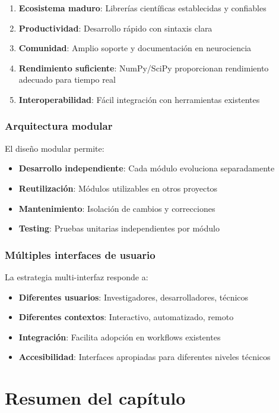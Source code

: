 \begin{itemize}
\begin{enumerate}
    \item \textbf{Ecosistema maduro}: Librerías científicas establecidas y confiables
    \item \textbf{Productividad}: Desarrollo rápido con sintaxis clara
    \item \textbf{Comunidad}: Amplio soporte y documentación en neurociencia
    \item \textbf{Rendimiento suficiente}: NumPy/SciPy proporcionan rendimiento adecuado para tiempo real
    \item \textbf{Interoperabilidad}: Fácil integración con herramientas existentes
\end{enumerate}

\subsubsection{Arquitectura modular}
El diseño modular permite:

\begin{itemize}
    \item \textbf{Desarrollo independiente}: Cada módulo evoluciona separadamente
    \item \textbf{Reutilización}: Módulos utilizables en otros proyectos
    \item \textbf{Mantenimiento}: Isolación de cambios y correcciones
    \item \textbf{Testing}: Pruebas unitarias independientes por módulo
\end{itemize}

\subsubsection{Múltiples interfaces de usuario}
La estrategia multi-interfaz responde a:

\begin{itemize}
    \item \textbf{Diferentes usuarios}: Investigadores, desarrolladores, técnicos
    \item \textbf{Diferentes contextos}: Interactivo, automatizado, remoto
    \item \textbf{Integración}: Facilita adopción en workflows existentes
    \item \textbf{Accesibilidad}: Interfaces apropiadas para diferentes niveles técnicos
\end{itemize}

\section{Resumen del capítulo}
\label{sec:resumen_estado_arte}


\end{itemize}
